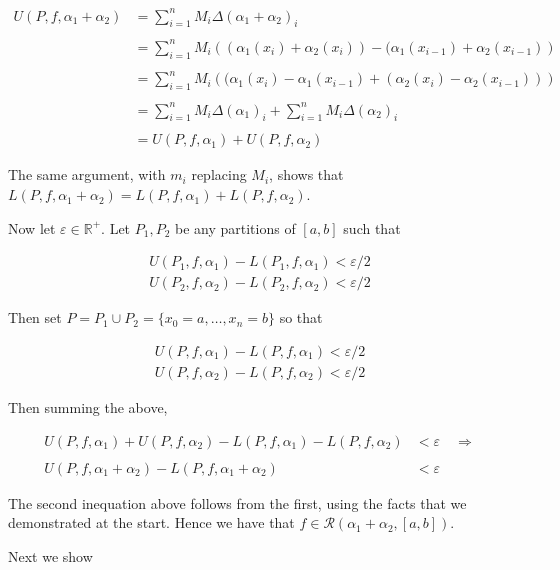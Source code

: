 \documentclass{article}
\begin{document}
  \begin{align*}
    U(P,f,\alpha_1+\alpha_2)&=\sum_{i=1}^n M_i\Delta(\alpha_1+\alpha_2)_i \\\\
    &= \sum_{i=1}^nM_i\left((\alpha_1(x_{i})+\alpha_2(x_{i}))-(\alpha_1(x_{i-1})+\alpha_2(x_{i-1})\right)\\\\
    &= \sum_{i=1}^n M_i\left((\alpha_1(x_{i})-\alpha_1(x_{i-1})+(\alpha_2(x_{i})-\alpha_2(x_{i-1}))\right) \\\\
    &= \sum_{i=1}^n M_i\Delta(\alpha_1)_i+\sum_{i=1}^nM_i\Delta(\alpha_2)_i \\\\
    &= U(P,f,\alpha_1)+U(P,f,\alpha_2)
  \end{align*}

  The same argument, with $m_i$ replacing $M_i$, shows that $L(P,f,\alpha_1+\alpha_2)=L(P,f,\alpha_1)+L(P,f,\alpha_2)$.

  Now let $\varepsilon\in\mathbb R^+$.  Let $P_1,P_2$ be any partitions of $[a,b]$ such that

  \begin{align*}
    U(P_1,f,\alpha_1) - L(P_1,f,\alpha_1) < \varepsilon/2\\
    U(P_2,f,\alpha_2) - L(P_2,f,\alpha_2) < \varepsilon/2
  \end{align*}

  Then set $P=P_1\cup P_2 = \{x_0=a,\dots,x_n=b\}$ so that

  \begin{align*}
    U(P,f,\alpha_1) - L(P,f,\alpha_1) < \varepsilon/2\\
    U(P,f,\alpha_2) - L(P,f,\alpha_2) < \varepsilon/2
  \end{align*}

  Then summing the above,

  \begin{align*}
    U(P,f,\alpha_1)+U(P,f,\alpha_2)-L(P,f,\alpha_1)-L(P,f,\alpha_2) &< \varepsilon \quad \Rightarrow \\\\
    U(P,f,\alpha_1+\alpha_2)-L(P,f,\alpha_1+\alpha_2) &< \varepsilon
  \end{align*}

  The second inequation above follows from the first, using the facts that we demonstrated at the start.  Hence we have that $f\in\mathscr R(\alpha_1+\alpha_2,[a,b])$.

  Next we show
\end{document}
